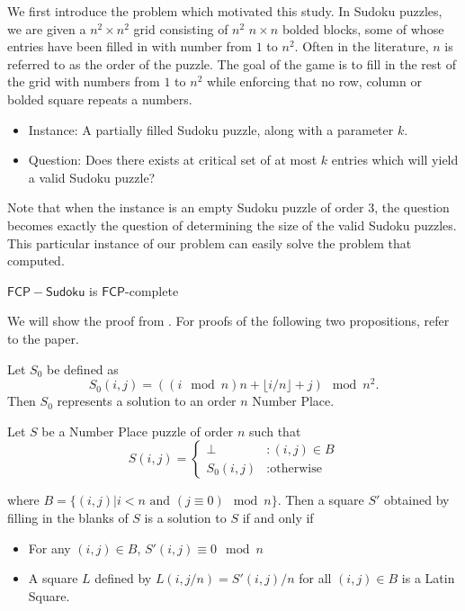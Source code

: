 \documentclass[runningheads,a4paper]{llncs}
\begin{document}
We first introduce the problem which motivated this study. In Sudoku puzzles, we are given a $n^2 \times n^2$ grid consisting of $n^2$ $n \times n$ bolded blocks, some of whose entries have been filled in with number from $1$ to $n^2$. Often in the literature, $n$ is referred to as the order of the puzzle. The goal of the game is to fill in the rest of the grid with numbers from $1$ to $n^2$ while enforcing that no row, column or bolded square repeats a numbers. 

\begin{itemize}
\item Instance: A partially filled Sudoku puzzle, along with a parameter $k$.
\item Question: Does there exists at critical set of at most $k$ entries which will yield a valid Sudoku puzzle?
\end{itemize}

Note that when the instance is an empty Sudoku puzzle of order 3, the question becomes exactly the question of determining the size of the valid Sudoku puzzles. This particular instance of our problem can easily solve the problem that \cite{mcguire2012there} computed. 

\begin{theorem}
$\mathsf{FCP-Sudoku}$ is $\mathsf{FCP}$-complete
\end{theorem}

We will show the proof from \cite{takayuki2003complexity}. For proofs of the following two propositions, refer to the paper. 

\begin{proposition}
Let $S_0$ be defined as
$$S_0 (i,j) = ((i \mod n) n + \lfloor i/n \rfloor + j) \mod n^2. $$
Then $S_0$ represents a solution to an order $n$ Number Place. 
\end{proposition}

\begin{proposition}
Let $S$ be a Number Place puzzle of order $n$ such that
\begin{displaymath}
S(i,j) = \left\{
\begin{array}{lr}
\perp & : (i,j) \in B\\
S_0 (i,j) & : \text{otherwise}
\end{array}
\right.
\end{displaymath}

where $B = \{ (i,j) | i < n \text{ and } (j \equiv 0) \mod n \}$. Then a square $S'$ obtained by filling in the blanks of $S$ is a solution to $S$ if and only if

\begin{itemize}
\item For any $(i,j) \in B$, $S'(i,j) \equiv 0 \mod n$
\item A square $L$ defined by $L(i, j/n) = S'(i,j)/n$ for all $(i, j) \in B$ is a Latin Square.
\end{itemize}

\end{proposition}
\end{document}
